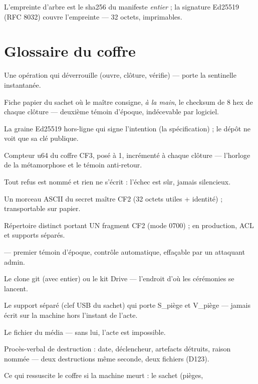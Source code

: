 L'empreinte d'arbre est le sha256 du manifeste \emph{entier} ; la signature Ed25519
(RFC 8032) couvre l'empreinte — 32 octets, imprimables.

\section{Glossaire du coffre}\label{sec:glossaire}

\begin{description}[style=nextline, leftmargin=1.2em]
\item[acte] Une opération qui déverrouille (ouvre, clôture, vérifie) — porte la
sentinelle instantanée.
\item[carte du sachet] Fiche papier du sachet où le maître consigne, \emph{à la main},
le checksum de 8 hex de chaque clôture — deuxième témoin d'époque, indécevable par
logiciel.
\item[clé I] La graine Ed25519 hors-ligne qui signe l'intention (la spécification) ;
le dépôt ne voit que sa clé publique.
\item[époque] Compteur u64 du coffre CF3, posé à 1, incrémenté à chaque clôture —
l'horloge de la métamorphose et le témoin anti-retour.
\item[fail-closed] Tout refus est nommé et rien ne s'écrit : l'échec est sûr, jamais
silencieux.
\item[fragment] Un morceau ASCII du secret maître CF2 (32 octets utiles + identité) ;
transportable sur papier.
\item[garde] Répertoire distinct portant UN fragment CF2 (mode 0700) ; en production,
ACL et supports séparés.
\item[journal local]  — premier témoin d'époque, contrôle
automatique, effaçable par un attaquant admin.
\item[maison] Le clone git (avec  entier) ou le kit Drive — l'endroit d'où
les cérémonies se lancent.
\item[média du piège] Le support séparé (clef USB du sachet) qui porte S\_piège et
V\_piège — jamais écrit sur la machine hors l'instant de l'acte.
\item[piège] Le fichier  du média — sans lui,
l'acte est impossible.
\item[PV] Procès-verbal de destruction : date, déclencheur, artefacts détruits,
raison nommée — deux destructions même seconde, deux fichiers (D123).
\item[relève] Ce qui ressuscite le coffre si la machine meurt : le sachet (pièges,

\end{description}
